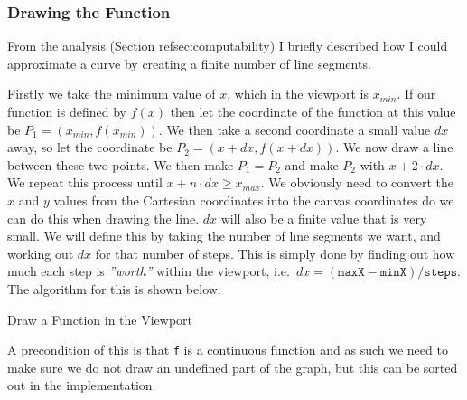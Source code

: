 \documentclass[../../../../../../main.tex]{subfiles}
\begin{document}
\subsubsection{Drawing the Function}
From the analysis (Section ref{sec:computability}) I briefly described how I could approximate a curve by creating a finite number of line segments.

Firstly we take the minimum value of $x$, which in the viewport is $x_{min}$. If our function is defined by $f(x)$ then let the coordinate of the function at this value be $P_1 = (x_{min},f(x_{min}))$. We then take a second coordinate a small value $dx$ away, so let the coordinate be $P_2 = (x+dx,f(x+dx))$. We now draw a line between these two points. We then make $P_1 = P_2$ and make $P_2$ with $x+2\cdot dx$. We repeat this process until $x+n\cdot dx \geq x_{max}$. We obviously need to convert the $x$ and $y$ values from the Cartesian coordinates into the canvas coordinates do we can do this when drawing the line. $dx$ will also be a finite value that is very small. We will define this by taking the number of line segments we want, and working out $dx$ for that number of steps. This is simply done by finding out how much each step is \textit{''worth''} within the viewport, i.e.\ $dx = (\texttt{maxX} - \texttt{minX})/\texttt{steps}$. The algorithm for this is shown below.

\begin{algorithm}
\DontPrintSemicolon
\caption{Draw a Function in the Viewport}
\end{algorithm}

A precondition of this is that \texttt{f} is a continuous function and as such we need to make sure we do not draw an undefined part of the graph, but this can be sorted out in the implementation.
\end{document}
